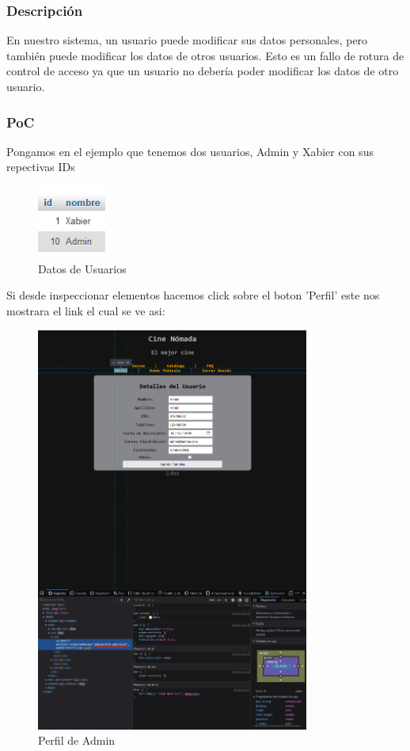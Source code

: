 \documentclass{report}
\begin{document}
                \subsubsection{Descripción}
                    En nuestro sistema, un usuario puede modificar sus datos personales, pero también puede modificar los datos de otros usuarios. 
                    Esto es un fallo de rotura de control de acceso ya que un usuario no debería poder modificar los datos de otro usuario.
                \subsubsection{PoC}
                    Pongamos en el ejemplo que tenemos dos usuarios, Admin y Xabier con sus repectivas IDs
                    \begin{figure}[H]
                        \centering
                        \includegraphics[width=0.2\textwidth]{./img/vulnerabilidades/3.1.1.1.png}
                        \caption{Datos de Usuarios}
                    \end{figure}
                    Si desde inspeccionar elementos hacemos click sobre el boton 'Perfil' este nos mostrara el link el cual se ve asi:
                    \begin{figure}[H]
                        \centering
                        \includegraphics[width=0.8\textwidth]{./img/vulnerabilidades/3.1.1.2.png}
                        \caption{Perfil de Admin}
                    \end{figure}
\end{document}
